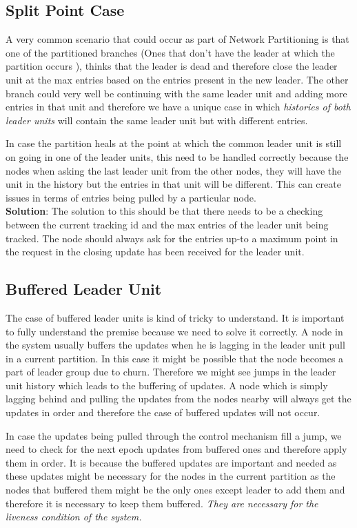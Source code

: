 \documentclass[a4paper, 11pt]{article}
\begin{document}
\subsection{Split Point Case} A very common scenario that could occur as part of Network Partitioning is that one of the partitioned branches (Ones that don't have the leader at which the partition occurs ), thinks that the leader is dead and therefore close the leader unit at the max entries based on the entries present in the new leader. The other branch could very well be continuing with the same leader unit and adding more entries in that unit and therefore  we have a unique case in which \textit{histories of both leader units} will contain the same leader unit but with different entries.

In case the partition heals at the point at which the common leader unit is still on going in one of the leader units, this need to be handled correctly because the nodes when asking the last leader unit from the other nodes, they will have the unit in the history but the entries in that unit will be different. This can create issues in terms of entries being pulled by a particular node. \\

\textbf{Solution}: The solution to this should be that there needs to be a checking between the current tracking id and the max entries of the leader unit being tracked. The node should always ask for the entries up-to a maximum point in the request in the closing update has been received for the leader unit. 

\subsection{Buffered Leader Unit} The case of buffered leader units is kind of tricky to understand. It is important to fully understand the premise because we need to solve it correctly. A node in the system usually buffers the updates when he is lagging in the leader unit pull in a current partition. In this case it might be possible that the node becomes a part of leader group due to churn. Therefore we might see jumps in the leader unit history which leads to the buffering of updates. A node which is simply lagging behind and pulling the updates from the nodes nearby will always get the updates in order and therefore the case of buffered updates will not occur.

In case the updates being pulled through the control mechanism fill a jump, we need to check for the next epoch updates from buffered ones and therefore apply them in order. It is because the buffered updates are important and needed as these updates might be necessary for the nodes in the current partition as the nodes that buffered them might be the only ones except leader to add them and therefore it is necessary to keep them buffered. \textit { They are necessary for the liveness condition of the system. }
\end{document}
